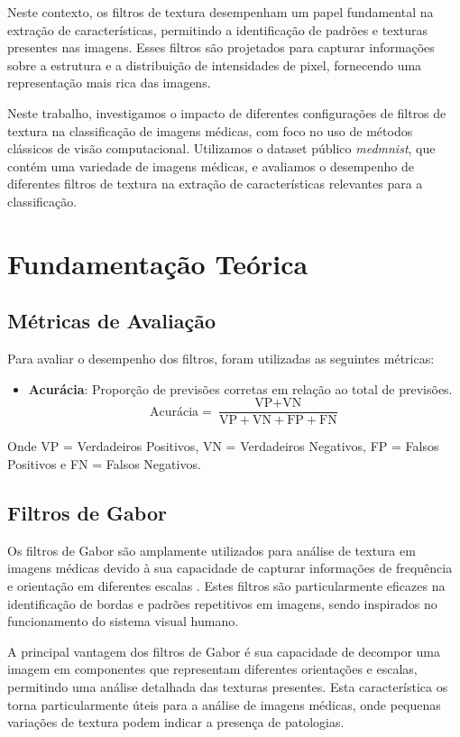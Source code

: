 \documentclass[sigconf,nonacm]{acmart}
\begin{document}
Neste contexto, os filtros de textura desempenham um papel fundamental na extração de características, permitindo a identificação de padrões e texturas presentes nas imagens. Esses filtros são projetados para capturar informações sobre a estrutura e a distribuição de intensidades de pixel, fornecendo uma representação mais rica das imagens.

Neste trabalho, investigamos o impacto de diferentes configurações de filtros de textura na classificação de imagens médicas, com foco no uso de métodos clássicos de visão computacional. Utilizamos o dataset público \textit{medmnist}, que contém uma variedade de imagens médicas, e avaliamos o desempenho de diferentes filtros de textura na extração de características relevantes para a classificação.


\section{Fundamentação Teórica}

\subsection{Métricas de Avaliação}
Para avaliar o desempenho dos filtros, foram utilizadas as seguintes métricas:

\begin{itemize}
  \item \textbf{Acurácia}: Proporção de previsões corretas em relação ao total de previsões. 
  \[
  \text{Acurácia} = \frac{\text{VP} + \text{VN}}{\text{VP} + \text{VN} + \text{FP} + \text{FN}}
  \]
\end{itemize}

Onde VP = Verdadeiros Positivos, VN = Verdadeiros Negativos, FP = Falsos Positivos e FN = Falsos Negativos.

\subsection{Filtros de Gabor}

Os filtros de Gabor são amplamente utilizados para análise de textura em imagens médicas devido à sua capacidade de capturar informações de frequência e orientação em diferentes escalas \cite{texture_feature_humeau_2019}. Estes filtros são particularmente eficazes na identificação de bordas e padrões repetitivos em imagens, sendo inspirados no funcionamento do sistema visual humano.

A principal vantagem dos filtros de Gabor é sua capacidade de decompor uma imagem em componentes que representam diferentes orientações e escalas, permitindo uma análise detalhada das texturas presentes. Esta característica os torna particularmente úteis para a análise de imagens médicas, onde pequenas variações de textura podem indicar a presença de patologias.
\end{document}
